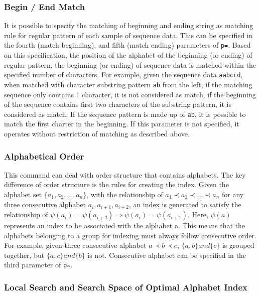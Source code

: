 \subsubsection{Begin / End Match }
It is possible to specify the matching of beginning and ending string as matching rule for regular pattern of each sample of sequence data. This can be specified in the fourth  (match beginning), and fifth (match ending) parameters of \verb|p=|. Based on this specification, the position of the alphabet of the beginning (or ending) of regular pattern, the beginning (or ending) of sequence data is matched within the specified number of characters. For example, given the sequence data \verb|aabccd|, when matched with character substring pattern \verb|ab| from the left, if the matching sequence only contains 1 character, it is not considered as match, if the beginning of the sequence contains first two characters of the substring pattern, it is considered as match.  If the sequence pattern is made up of \verb|ab|, it is possible to match the first charter in the beginning. If this parameter is not specified, it operates without restriction of matching as described above.



\subsubsection{Alphabetical Order}
This command can deal with order structure that contains alphabets. The key difference of order structure is the rules for creating the index. 
Given the alphabet set $\{a_1,a_2,\dots,a_n\}$, with the relationship of $a_1 \prec a_2 \prec \dots \prec a_n$ for any three consecutive alphabet $a_i,a_{i+1},a_{i+2}$, an index is generated to satisfy the relationship of $\psi(a_i)=\psi(a_{i+2}) \Rightarrow \psi(a_i)=\psi(a_{i+1})$. Here, $\psi(a)$ represents an index to be associated with the alphabet a. This means that the alphabets belonging to a group for indexing must always follow consecutive order. For example,  given three consecutive alphabet $a \prec b \prec c$, $\{a,b\} and \{c\}$ is grouped together, but $\{a,c\} and \{b\}$ is not. Consecutive alphabet can be specified in the third parameter of \verb|p=|. 


\subsubsection{Local Search and Search Space of Optimal Alphabet Index }

